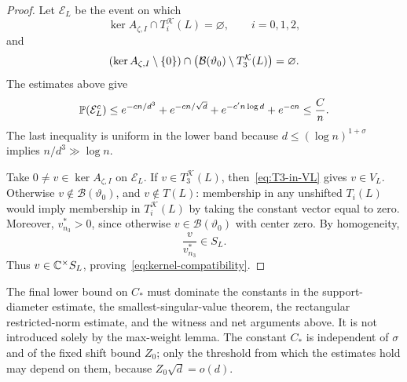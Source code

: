\begin{proof}
Let $\mathcal E_L$ be the event on which
\[
  \ker A_{\zeta,I}\cap T_i^{\mathcal K}(L)=\varnothing,
  \qquad i=0,1,2,
\]
and
\[
  (\ker A_{\zeta,I}\setminus\left\{0\right\})
  \cap\bigl(\mathcal B(\vartheta_0)\setminus T_3^{\mathcal K}(L)\bigr)
  =\varnothing.
\]
The estimates above give
\begin{equation}\label{eq:EL-failure}
  \mathbb P(\mathcal E_L^c)
  \le e^{-cn/d^3}+e^{-cn/\sqrt d}+e^{-c'n\log d}+e^{-cn}
  \le\frac Cn.
\end{equation}
The last inequality is uniform in the lower band because $d\le(\log n)^{1+\sigma}$ implies $n/d^3\gg\log n$.

Take $0\ne v\in\ker A_{\zeta,I}$ on $\mathcal E_L$. If $v\in T_3^{\mathcal K}(L)$, then~\eqref{eq:T3-in-VL} gives $v\in V_L$. Otherwise $v\notin\mathcal B(\vartheta_0)$, and $v\notin T(L)$: membership in any unshifted $T_i(L)$ would imply membership in $T_i^{\mathcal K}(L)$ by taking the constant vector equal to zero. Moreover, $v_{n_3}^*>0$, since otherwise $v\in\mathcal B(\vartheta_0)$ with center zero. By homogeneity,
\[
  \frac{v}{v_{n_3}^*}\in S_L.
\]
Thus $v\in\mathbb C^{\times}S_L$, proving~\eqref{eq:kernel-compatibility}.
\end{proof}

\begin{remark}\label{rem:final-Cstar}
The final lower bound on $C_*$ must dominate the constants in the support-diameter estimate, the smallest-singular-value theorem, the rectangular restricted-norm estimate, and the witness and net arguments above. It is not introduced solely by the max-weight lemma. The constant $C_*$ is independent of $\sigma$ and of the fixed shift bound $Z_0$; only the threshold from which the estimates hold may depend on them, because $Z_0\sqrt d=o(d)$.
\end{remark}
